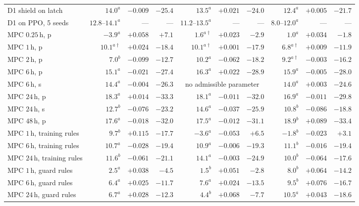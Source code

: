 \documentclass[3p,twocolumn,number]{elsarticle}
\begin{document}
\begin{table}[t]
\begin{tabular*}{\textwidth}{@{\extracolsep{\fill}}lrrrrrrrrr@{}}
D1 shield on latch & $14.0^{a}$ & $-0.009$ & $-25.4$ & $13.5^{a}$ & $+0.021$ & $-24.0$ & $12.4^{a}$ & $+0.005$ & $-21.7$ \\
D1 on PPO, 5 seeds & $12.8$--$14.1^{a}$ & --- & --- & $11.2$--$13.5^{a}$ & --- & --- & $8.0$--$12.0^{a}$ & --- & --- \\
MPC $0.25\,$h, p & $-3.9^{a}$ & $+0.058$ & $+7.1$ & $1.6^{a\dagger}$ & $+0.023$ & $-2.9$ & $1.0^{a}$ & $+0.034$ & $-1.8$ \\
MPC $1\,$h, p & $10.1^{a\dagger}$ & $+0.024$ & $-18.4$ & $10.1^{a\dagger}$ & $+0.001$ & $-17.9$ & $6.8^{a\dagger}$ & $+0.009$ & $-11.9$ \\
MPC $2\,$h, p & $7.0^{b}$ & $-0.099$ & $-12.7$ & $10.2^{a}$ & $-0.062$ & $-18.2$ & $9.2^{a\dagger}$ & $-0.003$ & $-16.2$ \\
MPC $6\,$h, p & $15.1^{a}$ & $-0.021$ & $-27.4$ & $16.3^{a}$ & $+0.022$ & $-28.9$ & $15.9^{a}$ & $-0.005$ & $-28.0$ \\
MPC $6\,$h, s & $14.4^{a}$ & $-0.004$ & $-26.3$ & \multicolumn{3}{c}{\footnotesize no admissible parameter} & $14.0^{a}$ & $+0.003$ & $-24.6$ \\
MPC $24\,$h, p & $18.3^{a}$ & $+0.014$ & $-33.3$ & $18.1^{a}$ & $-0.011$ & $-32.0$ & $16.9^{a}$ & $-0.011$ & $-29.8$ \\
MPC $24\,$h, s & $12.7^{b}$ & $-0.076$ & $-23.2$ & $14.6^{a}$ & $-0.037$ & $-25.9$ & $10.8^{b}$ & $-0.086$ & $-18.8$ \\
MPC $48\,$h, p & $17.6^{a}$ & $-0.018$ & $-32.0$ & $17.5^{a}$ & $-0.012$ & $-31.1$ & $18.9^{b}$ & $+0.089$ & $-33.4$ \\
MPC $1\,$h, training rules & $9.7^{b}$ & $+0.115$ & $-17.7$ & $-3.6^{a}$ & $-0.053$ & $+6.5$ & $-1.8^{b}$ & $-0.023$ & $+3.1$ \\
MPC $6\,$h, training rules & $10.7^{a}$ & $-0.028$ & $-19.4$ & $10.9^{a}$ & $-0.006$ & $-19.3$ & $11.1^{b}$ & $-0.016$ & $-19.4$ \\
MPC $24\,$h, training rules & $11.6^{b}$ & $-0.061$ & $-21.1$ & $14.1^{a}$ & $-0.003$ & $-24.9$ & $10.0^{b}$ & $-0.064$ & $-17.6$ \\
MPC $1\,$h, guard rules & $2.5^{a}$ & $+0.038$ & $-4.5$ & $1.5^{b}$ & $+0.051$ & $-2.8$ & $8.0^{b}$ & $+0.064$ & $-14.2$ \\
MPC $6\,$h, guard rules & $6.4^{a}$ & $+0.025$ & $-11.7$ & $7.6^{a}$ & $+0.024$ & $-13.5$ & $9.5^{b}$ & $+0.076$ & $-16.7$ \\
MPC $24\,$h, guard rules & $6.7^{a}$ & $+0.028$ & $-12.3$ & $4.4^{b}$ & $+0.068$ & $-7.7$ & $10.5^{a}$ & $+0.043$ & $-18.6$ \\

\end{tabular*}
\end{table}
\end{document}
